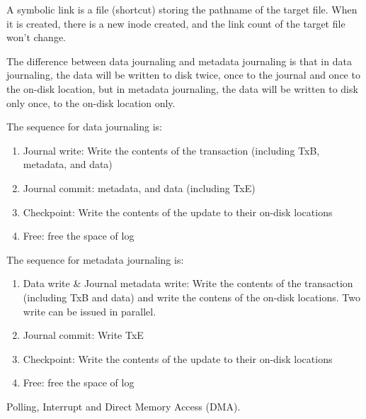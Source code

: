 \documentclass[11pt]{homework}
\begin{document}
A symbolic link is a file (shortcut) storing the pathname of the target file. When it is created,
there is a new inode created, and the link count of the target file won't change.

\question
The difference between data journaling and metadata journaling is that in data journaling, the data
will be written to disk twice, once to the journal and once to the on-disk location, but in
metadata journaling, the data will be written to disk only once, to the on-disk location only.

The sequence for data journaling is:
\begin{enumerate}
    \item Journal write: Write the contents of the transaction (including TxB, metadata, and data)
    \item Journal commit: metadata, and data (including TxE)
    \item Checkpoint: Write the contents of the update to their on-disk locations
    \item Free: free the space of log
\end{enumerate}

The sequence for metadata journaling is:
\begin{enumerate}
    \item Data write \& Journal metadata write: Write the contents of the transaction (including TxB
          and data) and write the contens of the on-disk locations. Two write can be issued in parallel.
    \item Journal commit: Write TxE
    \item Checkpoint: Write the contents of the update to their on-disk locations
    \item Free: free the space of log
\end{enumerate}

\question
Polling, Interrupt and Direct Memory Access (DMA).
\end{document}
